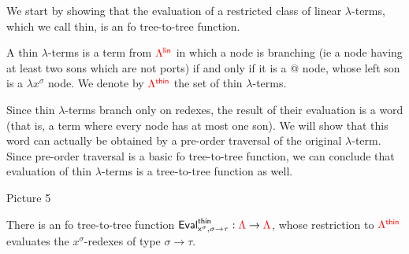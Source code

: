 We start by showing that the evaluation of a restricted class of linear $\lambda$-terms, which we call thin, is an fo tree-to-tree function.   

\begin{definition}
A thin $\lambda$-terms is a term from ${\color{red}{\Lambda^{\sf{lin}}}}$ in which a node is branching (ie a node having at least two sons which are not ports) if and only if it is a $\text{@}$ node, whose left son is a $\lambda x^\sigma$ node. We denote by ${\color{red}{\Lambda^{\sf{thin}}}}$ the set of thin $\lambda$-terms.
\end{definition}

Since thin $\lambda$-terms branch only on redexes, the result of their evaluation is a word (that is, a term where every node has at most one son).  We will show that this word can actually be obtained by a pre-order traversal of the original $\lambda$-term. 
Since pre-order traversal is a basic fo tree-to-tree function, we can conclude that evaluation of thin $\lambda$-terms is a tree-to-tree function as well. 

\begin{center}
Picture 5
\end{center}

\begin{proposition}\label{prop:EvaluateThin}
There is an fo tree-to-tree function ${\sf{Eval}^{\sf{thin}}_{x^\sigma,\sigma\rightarrow\tau}}:{\color{red}{\Lambda}}\to{\color{red}{\Lambda}}$, whose restriction to ${\color{red}{\Lambda^{\sf{thin}}}}$ evaluates the $x^\sigma$-redexes of type $\sigma\rightarrow\tau$.
\end{proposition}

